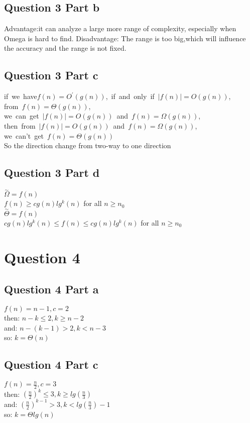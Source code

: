 \documentclass[paper=a4, fontsize=11pt]{scrartcl} %
\numberwithin{equation}{section} %
\numberwithin{figure}{section} %
\numberwithin{table}{section} %
\begin{document}
\subsection{Question 3 Part b}
Advantage:it can analyze a large more range of complexity, especially when Omega is hard to find.
Disadvantage: The range is too big,which will influence the accuracy and the range is not fixed.

\subsection{Question 3 Part c}
\mbox{if we have$f(n)=O^{'}(g(n))$, if and only if $|f(n)|=O(g(n))$, }\\
\mbox{from $f(n)=\Theta(g(n))$,}\\
\mbox{we can get $|f(n)|=O(g(n))$ and $f(n)=\Omega(g(n))$,}\\
\mbox{then from $|f(n)|=O(g(n))$ and $f(n)=\Omega(g(n))$,}\\
\mbox{we can't get $f(n)=\Theta(g(n))$ }\\
So the direction change from two-way to one direction

\subsection{Question 3 Part d}
$ \overset{\sim}{\Omega}=f(n) $\\
$ f(n)\geq cg(n)lg^k (n) $  for all $n \geq n_0 $ \\
$ \overset{\sim}{\Theta}=f(n) $\\
$ cg(n)lg ^k(n)\leq f(n)\leq cg(n)lg^k (n) $ for all $n \geq n_0 $ \\


\vspace{2cm}
\section{Question 4}
\subsection{Question 4 Part a}
$f(n)=n-1,c=2$ \\
then: $n-k\leq2, k\geq n-2$ \\
and: $ n-(k-1)>2,k<n-3$\\
so: $ k=\Theta(n)$

\subsection{Question 4 Part c}
$f(n)=\frac{n}{2},c=3 $\\
then: ${(\frac{n}{2})}^{k} \leq 3 , k \geq lg(\frac{n}{3})$\\
and: ${(\frac{n}{2})}^{k-1} > 3 , k < lg(\frac{n}{3})-1$\\
so: $ k=\Theta lg(n) $
\end{document}
